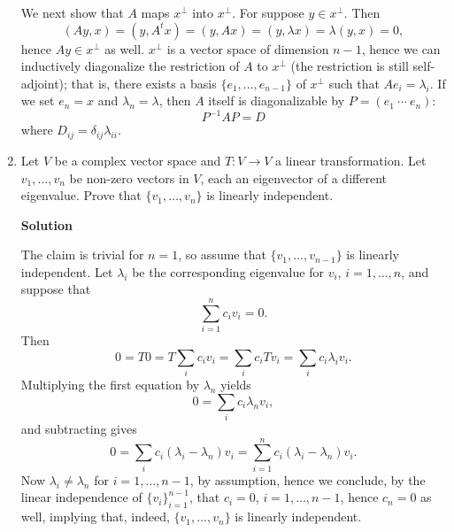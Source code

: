 \documentclass{article}
\begin{document}
\begin{enumerate}
We next show that \(A\) maps \(x^{\perp}\) into \(x^{\perp}\).  For suppose \(y \in x^{\perp}\).  Then
\[(Ay, x) = (y, A^tx) = (y, Ax) = (y, \lambda x) = \lambda (y, x) = 0,\]
hence \(Ay \in x^{\perp}\) as well.  \(x^{\perp}\) is a vector space of dimension \(n - 1\), hence we can inductively diagonalize the restriction of \(A\) to \(x^{\perp}\) (the restriction is still self-adjoint); that is, there exists a basis \(\{e_1, \ldots, e_{n - 1}\}\) of \(x^{\perp}\) such that \(Ae_i = \lambda_i\).  If we set \(e_n = x\) and \(\lambda_n = \lambda\), then \(A\) itself is diagonalizable by \(P = (e_1 \ \cdots \ e_n)\):
\[P^{-1} A P = D\]
where \(D_{ij} = \delta_{ij} \lambda_{ii}\).



\item Let \(V\) be a complex vector space and \(T : V \to V\) a linear transformation.  Let \(v_1, \ldots, v_n\) be non-zero vectors in \(V\), each an eigenvector of a different eigenvalue.  Prove that \(\{v_1, \ldots, v_n\}\) is linearly independent.

{\bf Solution}

The claim is trivial for \(n = 1\), so assume that \(\{v_1, \ldots, v_{n - 1}\}\) is linearly independent.  Let \(\lambda_i\) be the corresponding eigenvalue for \(v_i\), \(i = 1, \ldots, n\), and suppose that
\[\sum_{i = 1}^n c_i v_i = 0.\]
Then
\[0 = T0 = T \sum_i c_i v_i = \sum_i c_i Tv_i = \sum_i c_i \lambda_i v_i.\]
Multiplying the first equation by \(\lambda_n\) yields
\[0 = \sum_i c_i \lambda_n v_i,\]
and subtracting gives
\[0 = \sum_i c_i (\lambda_i - \lambda_n) v_i
    = \sum_{i = 1}^n c_i (\lambda_i - \lambda_n) v_i.\]
Now \(\lambda_i \neq \lambda_n\) for \(i = 1, \ldots, n - 1\), by assumption, hence we conclude, by the linear independence of \(\{v_i\}_{i = 1}^{n - 1}\), that \(c_i = 0\), \(i = 1, \ldots, n - 1\), hence \(c_n = 0\) as well, implying that, indeed, \(\{v_1, \ldots, v_n\}\) is linearly independent.



\end{enumerate}
\end{document}
